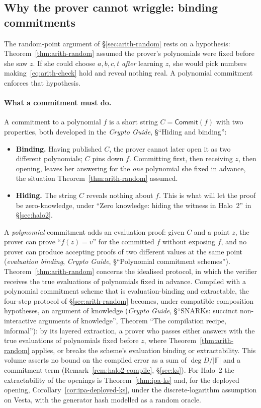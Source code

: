 \documentclass[11pt,a4paper]{article}
\theoremstyle{definition}
\newcommand{\F}{\mathbb{F}}
\newcommand{\Comm}{\mathsf{Commit}}
\begin{document}
\subsection{Why the prover cannot wriggle: binding commitments}
\label{sec:arith-commit}

The random-point argument of \S\ref{sec:arith-random} rests on a hypothesis:
Theorem~\ref{thm:arith-random} assumed the prover's polynomials were fixed
before she saw $z$. If she could choose $a, b, c, t$ \emph{after} learning
$z$, she would pick numbers making~\eqref{eq:arith-check} hold and
reveal nothing real. A polynomial commitment enforces that hypothesis.

\paragraph{What a commitment must do.}
A commitment to a polynomial $f$ is a short string $C = \Comm(f)$ with
two properties, both developed in the \emph{Crypto Guide},
\S``Hiding and binding'':
\begin{itemize}[leftmargin=*, itemsep=1pt]
\item \textbf{Binding.} Having published $C$, the prover cannot later open
  it as two different polynomials; $C$ pins down $f$. Committing first,
  then receiving $z$, then opening, leaves her answering for the
  \emph{one} polynomial she fixed in advance, the situation
  Theorem~\ref{thm:arith-random} assumed.
\item \textbf{Hiding.} The string $C$ reveals nothing about $f$. This is
  what will let the proof be zero-knowledge, under ``Zero knowledge:
  hiding the witness in Halo~2'' in \S\ref{sec:halo2}.
\end{itemize}
A \emph{polynomial} commitment adds an evaluation proof: given $C$ and a
point $z$, the prover can prove ``$f(z) = v$'' for the committed $f$
without exposing $f$, and no prover can produce accepting proofs of two
different values at the same point (\emph{evaluation binding},
\emph{Crypto Guide}, \S``Polynomial commitment schemes'').
Theorem~\ref{thm:arith-random} concerns the idealised protocol, in which
the verifier receives the true evaluations of polynomials fixed in
advance. Compiled with a polynomial commitment scheme that is
evaluation-binding and extractable, the four-step protocol of
\S\ref{sec:arith-random} becomes, under compatible composition
hypotheses, an argument of knowledge (\emph{Crypto Guide},
\S``SNARKs: succinct non-interactive arguments of knowledge'', Theorem
``The compilation recipe, informal''): by its layered extraction, a
prover who passes either answers with the true evaluations of
polynomials fixed before $z$, where Theorem~\ref{thm:arith-random}
applies, or breaks the scheme's evaluation binding or extractability.
This volume asserts no bound on the compiled error as a sum of
$\deg D/|\F|$ and a commitment term (Remark~\ref{rem:halo2-compile},
\S\ref{sec:ks}). For Halo~2 the extractability of the openings is
Theorem~\ref{thm:ipa-ks} and, for the deployed opening,
Corollary~\ref{cor:ipa-deployed-ks}, under the discrete-logarithm
assumption on Vesta, with the generator hash modelled as a random oracle.
\end{document}

